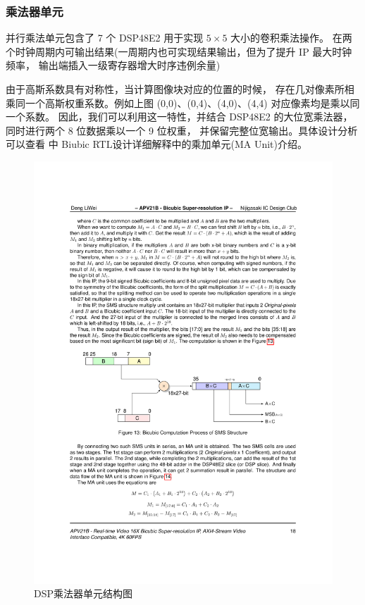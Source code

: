 \documentclass[12pt, a4paper, oneside]{ctexbook}
\begin{document}
	\subsubsection{乘法器单元} \label{mul_unit}
	并行乘法单元包含了 7 个 DSP48E2 用于实现 $5\times5$ 大小的卷积乘法操作。
	在两个时钟周期内可输出结果(一周期内也可实现结果输出，但为了提升 IP 最大时钟频率，
	输出端插入一级寄存器增大时序违例余量)\par 由于高斯系数具有对称性，当计算图像块对应的位置的时候，
	存在几对像素所相乘同一个高斯权重系数。例如上图 (0,0)、(0,4)、(4,0)、(4,4) 对应像素均是乘以同一个系数。
	因此，我们可以利用这一特性，并结合 DSP48E2 的大位宽乘法器，同时进行两个 8 位数据乘以一个 9 位权重，
	并保留完整位宽输出。具体设计分析可以查看 \textbf{} 中 Biubic RTL设计详细解释中的乘加单元(MA Unit)介绍。%
	\begin{figure}[h]
		\centering
		\includegraphics[scale=1]{pic/mul_unit}
		\caption{DSP乘法器单元结构图}
		\label{fig:mulunit}
	\end{figure}
\end{document}
